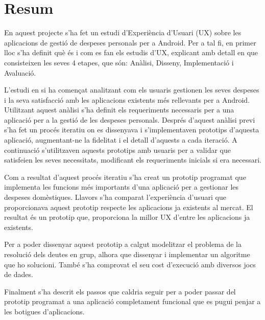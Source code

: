 \chapter*{Resum} \label{sec:Resum}

En aquest projecte s'ha fet un estudi d'Experiència d'Usuari (UX) sobre les aplicacions de gestió de despeses personals per a \gls{Android}. Per a tal fi, en primer lloc s'ha definit què és i com es fan els estudis d'UX, explicant amb detall en que consisteixen les seves 4 etapes, que són: Anàlisi, Disseny, Implementació i Avaluació.

L'estudi en si ha començat analitzant com els usuaris gestionen les seves despeses i la seva satisfacció amb les aplicacions existents més rellevants per a \gls{Android}. Utilitzant aquest anàlisi s'ha definit els requeriments necessaris per a una aplicació per a la gestió de les despeses personals. Després d'aquest anàlisi previ s'ha fet un procés iteratiu on es dissenyava i s'implementaven prototips d'aquesta aplicació, augmentant-ne la fidelitat i el detall d'aquests a cada iteració. A continuació s'utilitzaven aquests prototips amb usuaris per a validar que satisfeien les seves necessitats, modificant els requeriments inicials si era necessari. 

Com a resultat d'aquest procés iteratiu s'ha creat un prototip programat que implementa les funcions més importants d'una aplicació per a gestionar les despeses domèstiques. Llavors s'ha comparat l'experiència d'usuari que proporcionava aquest prototip respecte les aplicacions ja existents al mercat. El resultat és un prototip que, proporciona la millor UX d'entre les aplicacions ja existents.

Per a poder dissenyar aquest prototip a calgut modelitzar el problema de la resolució dels deutes en grup, alhora que dissenyar i implementar un algoritme que ho solucioni. També s'ha comprovat el seu cost d'execució amb diversos jocs de dades. 

Finalment s'ha descrit els passos que caldria seguir per a poder passar del prototip programat a una aplicació completament funcional que es pugui penjar a les botigues d'aplicacions. 



